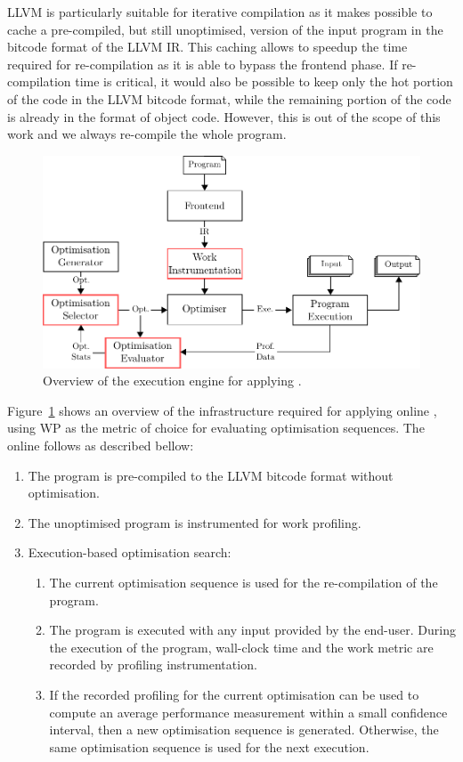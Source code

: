 LLVM is particularly suitable for iterative compilation as it makes possible to cache a pre-compiled, but still unoptimised, version of the input program in the bitcode format of the LLVM IR.  
This caching allows to speedup the time required for re-compilation as it is able to bypass the frontend phase.
If re-compilation time is critical, it would also be possible to keep only the hot portion of the code in the LLVM bitcode format, while the remaining portion of the code is already in the format of object code.
However, this is out of the scope of this work and we always re-compile the whole program.

\begin{figure}[htb]
    \centering
    \includegraphics[width=\linewidth]{figs/infra-diagram}
    \caption{Overview of the execution engine for applying {\itercomp}.}
    \label{fig:infra-diagram}
\end{figure}

Figure~\ref{fig:infra-diagram} shows an overview of the infrastructure required for applying online {\itercomp},
using WP as the metric of choice for evaluating optimisation sequences.
The online {\itercomp} follows as described bellow:
\begin{enumerate}
\item The program is pre-compiled to the LLVM bitcode format without optimisation.
\item The unoptimised program is instrumented for work profiling.
\item Execution-based optimisation search:
 \begin{enumerate}
   \item The current optimisation sequence is used for the re-compilation of the program.
   \item The program is executed with any input provided by the end-user.
         During the execution of the program, wall-clock time and the work metric are recorded by profiling instrumentation.
   \item If the recorded profiling for the current optimisation can be used to compute an average performance measurement within a small confidence interval,
         then a new optimisation sequence is generated.
         Otherwise, the same optimisation sequence is used for the next execution.
 \end{enumerate}
\end{enumerate}

